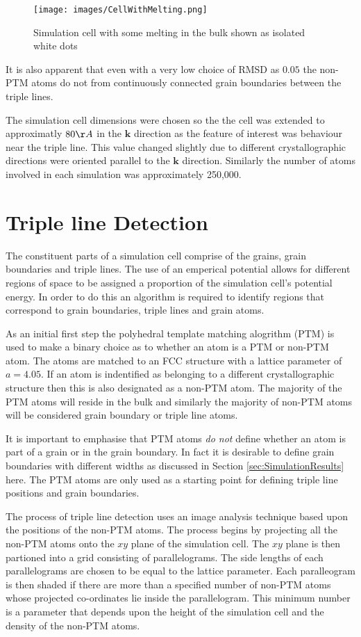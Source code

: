 \documentclass[12pt,a4paper]{book}
\begin{document}
\begin{figure}[H]
	\centering
	\texttt{[image: images/CellWithMelting.png]} 
	\label{fig:CellMelt}
	\caption{Simulation cell with some melting in the bulk shown
	as isolated white dots}
\end{figure}

It is also apparent that even with a very low choice of RMSD as $0.05$ the non-PTM atoms do not from continuously connected grain boundaries between the triple lines.

The simulation cell dimensions were chosen so the the cell was extended to approximatly $80 \AA$ in the $\mathbf{k}$ direction as the feature of interest was behaviour near the triple line. This value changed slightly due to different crystallographic directions were oriented parallel to the $\mathbf{k}$ direction. Similarly the number of atoms involved in each simulation was approximately 250,000.  


\section{Triple line Detection}

The constituent parts of a simulation cell comprise of the grains, grain boundaries and triple lines. The use of an emperical potential allows for different regions of space to be assigned a proportion of the simulation cell's potential energy. In order to do this an algorithm is required to identify regions that correspond to grain boundaries, triple lines and grain atoms.

As an initial first step the polyhedral template matching alogrithm (PTM) is used to make a binary choice as to whether an atom is a PTM or non-PTM atom. The atoms are matched to an FCC structure with a lattice parameter of $a=4.05$. If an atom is indentified as belonging to a different crystallographic structure then this is also designated as a non-PTM atom. The majority of the PTM atoms will reside in the bulk and similarly the majority of non-PTM atoms will be considered grain boundary or triple line atoms. 

It is important to emphasise that PTM atoms \emph{do not} define whether an atom is part of a grain or in the grain boundary. In fact it is desirable to define grain boundaries with different widths as discussed in Section \ref{sec:SimulationResults} here. The PTM atoms are only used as a starting point for defining triple line positions and grain boundaries.

The process of triple line detection uses an image analysis technique based upon the positions of the non-PTM atoms. The process begins by projecting all the non-PTM atoms onto the $xy$ plane of the simulation cell. The $xy$ plane is then partioned into a grid consisting of parallelograms. The side lengths of each parallelograms are chosen to be equal to the lattice parameter. Each paralleogram is then shaded if there are more than a specified number of non-PTM atoms whose projected co-ordinates lie inside the parallelogram. This minimum number is a parameter that depends upon the height of the simulation cell and the density of the non-PTM atoms.
\end{document}
